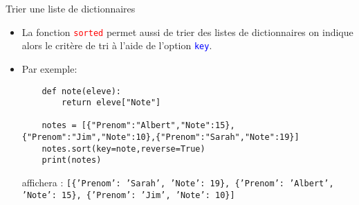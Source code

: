 \documentclass[10pt]{beamer}
\begin{document}
\begin{frame}[fragile]
	\mframe{\DB}
	\begin{alertblock}{Trier une liste de dictionnaires}
		\begin{itemize}
			\item<1-> La fonction \textcolor{red}{\tt sorted} permet aussi de trier des listes de dictionnaires on indique alors le critère de tri à l'aide de l'option \textcolor{blue}{\tt key}.
			\item<2-> Par exemple:
			      \begin{lstlisting}
	def note(eleve):
		return eleve["Note"]	
	
	notes = [{"Prenom":"Albert","Note":15},{"Prenom":"Jim","Note":10},{"Prenom":"Sarah","Note":19}]
	notes.sort(key=note,reverse=True)
	print(notes)
	 \end{lstlisting}
			      affichera : {\tt [\{'Prenom': 'Sarah', 'Note': 19\}, \{'Prenom': 'Albert', 'Note': 15\}, \{'Prenom': 'Jim', 'Note': 10\}]}
		\end{itemize}
	\end{alertblock}
\end{frame}
\end{document}
